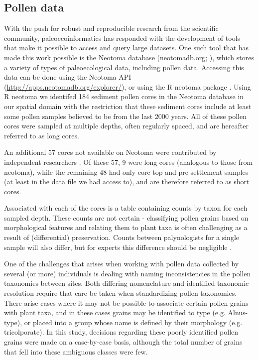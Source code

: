 \documentclass[12pt]{article}
\begin{document}

\subsection{Pollen data}

With the push for robust and reproducible research from the scientific
community, paleoecoinformatics has responded with the development of
tools that make it possible to access and query large datasets. One
such tool that has made this work possible is the Neotoma database
(\url{neotomadb.org}; \citep{XXX}), which stores a variety of types of
paleoecological data, including pollen data. Accessing this data can
be done using the Neotoma API
(\url{http://apps.neotomadb.org/explorer/}), or using the R neotoma
package \citep{goring2015}. Using R neotoma we identifed 184 sediment
pollen cores in the Neotoma database in our spatial domain with the
restriction that these sediment cores include at least some pollen
samples believed to be from the last 2000 years. All of these pollen
cores were sampled at multiple depths, often regularly spaced, and are
hereafter referred to as long cores.

An additional 57 cores not available on Neotoma were contributed by
independent researchers \citep{kujawa2015}. Of these 57, 9 were long
cores (analogous to those from neotoma), while the remaining 48 had
only core top and pre-settlement samples (at least in the data file we
had access to), and are therefore referred to as short cores.

Associated with each of the cores is a table containing counts by
taxon for each sampled depth. These counts are not certain -
classifying pollen grains based on morphological features and relating
them to plant taxa is often challenging as a result of (differential)
preservation. Counts between palynologists for a single sample will
also differ, but for experts this difference should be negligible
\citep{XXX}.

One of the challenges that arises when working with pollen data
collected by several (or more) individuals is dealing with naming
inconsistencies in the pollen taxonomies between sites. Both differing
nomenclature and identified taxonomic resolution require that care be
taken when standardizing pollen taxonomies. There arise cases where it
may not be possible to associate certain pollen grains with plant
taxa, and in these cases grains may be identified to type
(e.g. Alnus-type), or placed into a group whose name is defined by
their morphology (e.g. tricolporate). In this study, decisions
regarding these poorly identified pollen grains were made on a
case-by-case basis, although the total number of grains that fell into
these ambiguous classes were few.
\end{document}

